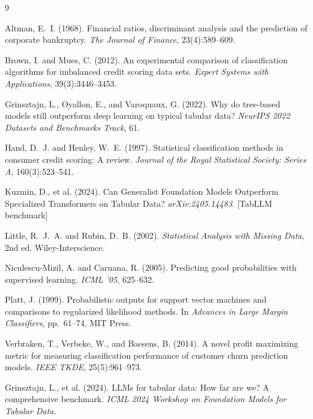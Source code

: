 \documentclass[11pt, a4paper]{article}
\begin{document}
\newpage

\begin{thebibliography}{9}

 Altman, E.~I. (1968). Financial ratios, discriminant analysis and the prediction of corporate bankruptcy. \emph{The Journal of Finance}, 23(4):589--609.

 Brown, I. and Mues, C. (2012). An experimental comparison of classification algorithms for imbalanced credit scoring data sets. \emph{Expert Systems with Applications}, 39(3):3446--3453.

 Grinsztajn, L., Oyallon, E., and Varoquaux, G. (2022). Why do tree-based models still outperform deep learning on typical tabular data? \emph{NeurIPS 2022 Datasets and Benchmarks Track}, 61.

 Hand, D.~J. and Henley, W.~E. (1997). Statistical classification methods in consumer credit scoring: A review. \emph{Journal of the Royal Statistical Society: Series A}, 160(3):523--541.

 Kuzmin, D., et al. (2024). Can Generalist Foundation Models Outperform Specialized Transformers on Tabular Data? \emph{arXiv:2405.14483}. [TabLLM benchmark]

 Little, R.~J.~A. and Rubin, D.~B. (2002). \emph{Statistical Analysis with Missing Data}, 2nd ed. Wiley-Interscience.

 Niculescu-Mizil, A. and Caruana, R. (2005). Predicting good probabilities with supervised learning. \emph{ICML '05}, 625--632.

 Platt, J. (1999). Probabilistic outputs for support vector machines and comparisons to regularized likelihood methods. In \emph{Advances in Large Margin Classifiers}, pp.~61--74. MIT Press.

 Verbraken, T., Verbeke, W., and Baesens, B. (2014). A novel profit maximizing metric for measuring classification performance of customer churn prediction models. \emph{IEEE TKDE}, 25(5):961--973.

 Grinsztajn, L., et al. (2024). LLMs for tabular data: How far are we? A comprehensive benchmark. \emph{ICML 2024 Workshop on Foundation Models for Tabular Data}.

\end{thebibliography}
\end{document}
